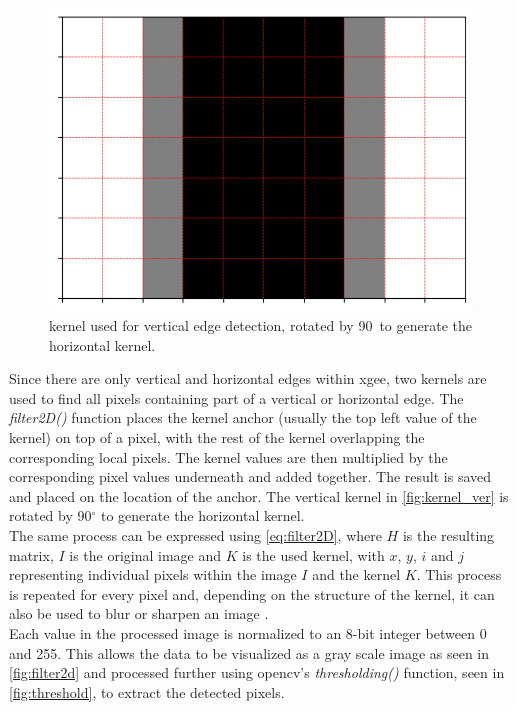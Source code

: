 \begin{figure}
    \centering
    \includegraphics[width=\linewidth]{pictures/kernel_ver.png}
    \caption{kernel used for vertical edge detection, rotated by 90\textdegree\ to generate the horizontal kernel.}
    \label{fig:kernel_ver}
\end{figure}
Since there are only vertical and horizontal edges within \acrshort{xgee}, two kernels are used to find all pixels containing part of a vertical or horizontal edge. The \textit{filter2D()} function places the kernel anchor (usually the top left value of the kernel) on top of a pixel, with the rest of the kernel overlapping the corresponding local pixels. The kernel values are then multiplied by the corresponding pixel values underneath and added together. The result is saved and placed on the location of the anchor. The vertical kernel in \autoref{fig:kernel_ver} is rotated by 90$^{\circ}$ to generate the horizontal kernel.\\
The same process can be expressed using \autoref{eq:filter2D}, where $H$ is the resulting matrix, $I$ is the original image and $K$ is the used kernel, with $x$, $y$, $i$ and $j$ representing individual pixels within the image $I$ and the kernel $K$. This process is repeated for every pixel and, depending on the structure of the kernel, it can also be used to blur or sharpen an image \cite{opencv_filter2d_2024}.\\
Each value in the processed image is normalized to an 8-bit integer between 0 and 255. This allows the data to be visualized as a gray scale image as seen in \autoref{fig:filter2d} and processed further using \acrshort{opencv}'s \textit{thresholding()} function, seen in \autoref{fig:threshold}, to extract the detected pixels.\\

